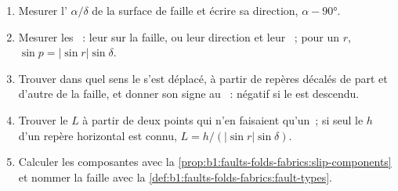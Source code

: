 \begin{method}\label{met:b1:faults-folds-fabrics:slip}
\begin{enumerate}
  \item Mesurer l' $\alpha/\delta$ de la surface de faille et écrire sa
        direction, $\alpha - \ang{90}$.
  \item Mesurer les ~: leur  sur la faille, ou leur direction et leur
        ~; pour un  $r$, $\sin p = |\sin r|\sin\delta$.
  \item Trouver dans quel sens le  s'est déplacé, à partir de repères décalés de part et d'autre de la
        faille, et donner son signe au ~: négatif si le  est
        descendu.
  \item Trouver le  $L$ à partir de deux points qui n'en faisaient qu'un~; si seul le
         $h$ d'un repère horizontal est connu, $L = h/(|\sin r|\sin\delta)$.
  \item Calculer les composantes avec
        la \cref{prop:b1:faults-folds-fabrics:slip-components} et nommer la faille
        avec la \cref{def:b1:faults-folds-fabrics:fault-types}.
\end{enumerate}
\end{method}

